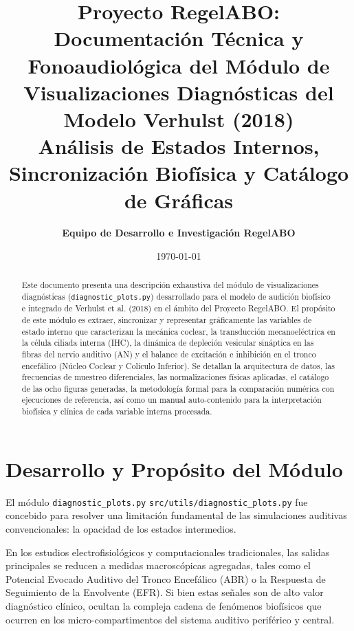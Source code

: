 \documentclass[12pt,a4paper]{article}
\title{\textbf{\Large Proyecto RegelABO: Documentación Técnica y Fonoaudiológica del Módulo de Visualizaciones Diagnósticas del Modelo Verhulst (2018)}\\[0.5em]
\large Análisis de Estados Internos, Sincronización Biofísica y Catálogo de Gráficas}
\author{\textbf{Equipo de Desarrollo e Investigación RegelABO}}
\date{\today}
\begin{document}
\maketitle

\begin{abstract}
Este documento presenta una descripción exhaustiva del módulo de visualizaciones diagnósticas (\texttt{diagnostic\_plots.py}) desarrollado para el modelo de audición biofísico e integrado de Verhulst et al. (2018) en el ámbito del Proyecto RegelABO. El propósito de este módulo es extraer, sincronizar y representar gráficamente las variables de estado interno que caracterizan la mecánica coclear, la transducción mecanoeléctrica en la célula ciliada interna (IHC), la dinámica de depleción vesicular sináptica en las fibras del nervio auditivo (AN) y el balance de excitación e inhibición en el tronco encefálico (Núcleo Coclear y Colículo Inferior). Se detallan la arquitectura de datos, las frecuencias de muestreo diferenciales, las normalizaciones físicas aplicadas, el catálogo de las ocho figuras generadas, la metodología formal para la comparación numérica con ejecuciones de referencia, así como un manual auto-contenido para la interpretación biofísica y clínica de cada variable interna procesada.
\end{abstract}

\tableofcontents
\newpage

\section{Desarrollo y Propósito del Módulo}

El módulo \texttt{diagnostic\_plots.py} {\texttt{src/utils/diagnostic\_plots.py}} fue concebido para resolver una limitación fundamental de las simulaciones auditivas convencionales: la opacidad de los estados intermedios. 

En los estudios electrofisiológicos y computacionales tradicionales, las salidas principales se reducen a medidas macroscópicas agregadas, tales como el Potencial Evocado Auditivo del Tronco Encefálico (ABR) o la Respuesta de Seguimiento de la Envolvente (EFR). Si bien estas señales son de alto valor diagnóstico clínico, ocultan la compleja cadena de fenómenos biofísicos que ocurren en los micro-compartimentos del sistema auditivo periférico y central.
\end{document}
